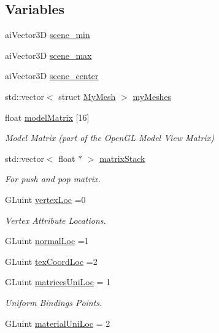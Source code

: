 \subsection*{Variables}
\begin{DoxyCompactItemize}
\item 
ai\-Vector3\-D \hyperlink{model_8cu_a52c5663b71d3f45942f9dabf61485686}{scene\-\_\-min}
\item 
ai\-Vector3\-D \hyperlink{model_8cu_a0778234d487fcc70e8cd289ac0322799}{scene\-\_\-max}
\item 
ai\-Vector3\-D \hyperlink{model_8cu_ab6d811204eda46a18e0d5cb6182521d9}{scene\-\_\-center}
\item 
std\-::vector$<$ struct \hyperlink{structMyMesh}{My\-Mesh} $>$ \hyperlink{model_8cu_a6c07ad8099da4a08eb875a7a2f98e5c1}{my\-Meshes}
\item 
float \hyperlink{model_8cu_a3172941d9cdfe886976ac7aca79bdd38}{model\-Matrix} \mbox{[}16\mbox{]}
\begin{DoxyCompactList}\small\item\em Model Matrix (part of the Open\-G\-L Model View Matrix) \end{DoxyCompactList}\item 
std\-::vector$<$ float $\ast$ $>$ \hyperlink{model_8cu_a2d79b97202d353b8484d554d4eec887a}{matrix\-Stack}
\begin{DoxyCompactList}\small\item\em For push and pop matrix. \end{DoxyCompactList}\item 
G\-Luint \hyperlink{model_8cu_a5711328d3ae0b85040c6b5ab7a068938}{vertex\-Loc} =0
\begin{DoxyCompactList}\small\item\em Vertex Attribute Locations. \end{DoxyCompactList}\item 
G\-Luint \hyperlink{model_8cu_a56e36f00ac5f661588ac29611cfce147}{normal\-Loc} =1
\item 
G\-Luint \hyperlink{model_8cu_a1a017d1373ae220b4ec413d55eebf11c}{tex\-Coord\-Loc} =2
\item 
G\-Luint \hyperlink{model_8cu_ac02c3eda5bd826029d27c463d16e2e9d}{matrices\-Uni\-Loc} = 1
\begin{DoxyCompactList}\small\item\em Uniform Bindings Points. \end{DoxyCompactList}\item 
G\-Luint \hyperlink{model_8cu_a4da0b71259cea0b7a2fa5d47c9a33061}{material\-Uni\-Loc} = 2

\end{DoxyCompactItemize}
